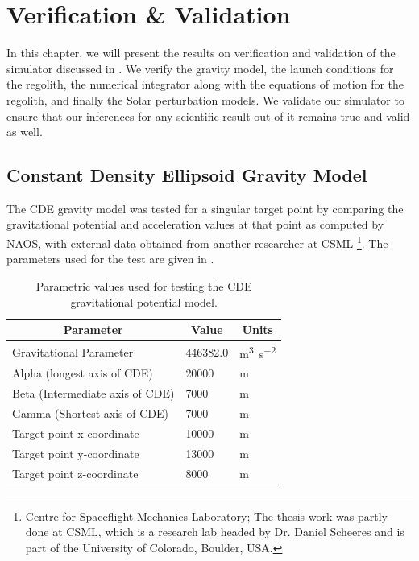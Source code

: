 \chapter{Verification \& Validation}
\label{chap:v_and_v}
\graphicspath{{V&V/}}

In this chapter, we will present the results on verification and validation of the simulator discussed in . We verify the gravity model, the launch conditions for the regolith, the numerical integrator along with the equations of motion for the regolith, and finally the Solar perturbation models. We validate our simulator to ensure that our inferences for any scientific result out of it remains true and valid as well.

\section{Constant Density Ellipsoid Gravity Model}
\label{sec:gravity_vv}
The \gls{CDE} gravity model was tested for a singular target point by comparing the gravitational potential and acceleration values at that point as computed by \gls{NAOS}, with external data obtained from another researcher at CSML \footnote{Centre for Spaceflight Mechanics Laboratory; The thesis work was partly done at CSML, which is a research lab headed by Dr. Daniel Scheeres and is part of the University of Colorado, Boulder, USA.}. The parameters used for the test are given in .
\begin{table}[htb]
\centering
\captionsetup{justification=centering}
\caption{Parametric values used for testing the \gls{CDE} gravitational potential model.}
\label{tab:gravity_vv_params}
\begin{tabular}{|l|l|l|}
\hline
\multicolumn{1}{|c|}{\textbf{Parameter}} & \multicolumn{1}{c|}{\textbf{Value}} & \multicolumn{1}{c|}{\textbf{Units}}      \\ \hline
Gravitational Parameter                  & 446382.0                            & \si{\metre \cubed \per \second \squared} \\ \hline
Alpha (longest axis of \gls{CDE})      & 20000                               & \si{\metre}                            \\ \hline
Beta (Intermediate axis of \gls{CDE})  & 7000                                & \si{\metre}                            \\ \hline
Gamma (Shortest axis of \gls{CDE})     & 7000                                & \si{\metre}                            \\ \hline
Target point x-coordinate                & 10000                               & \si{\metre}                            \\ \hline
Target point y-coordinate                & 13000                               & \si{\metre}                            \\ \hline
Target point z-coordinate                & 8000                                & \si{\metre}                            \\ \hline
\end{tabular}
\end{table}
